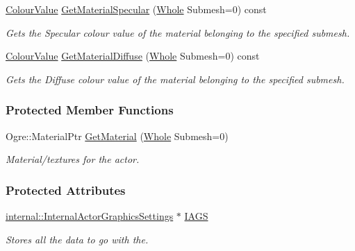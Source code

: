 \begin{DoxyCompactItemize}
\hyperlink{classphys_1_1ColourValue}{ColourValue} \hyperlink{classphys_1_1ActorGraphicsSettings_a2598d7db0dd899417aa3e4d017b8c6ab}{GetMaterialSpecular} (\hyperlink{namespacephys_a460f6bc24c8dd347b05e0366ae34f34a}{Whole} Submesh=0) const 
\begin{DoxyCompactList}\small\item\em Gets the Specular colour value of the material belonging to the specified submesh. \item\end{DoxyCompactList}\item 
\hyperlink{classphys_1_1ColourValue}{ColourValue} \hyperlink{classphys_1_1ActorGraphicsSettings_ab4b2a4938c6fb0c400882fb929bc7133}{GetMaterialDiffuse} (\hyperlink{namespacephys_a460f6bc24c8dd347b05e0366ae34f34a}{Whole} Submesh=0) const 
\begin{DoxyCompactList}\small\item\em Gets the Diffuse colour value of the material belonging to the specified submesh. \item\end{DoxyCompactList}\end{DoxyCompactItemize}
\subsubsection*{Protected Member Functions}
\begin{DoxyCompactItemize}
\item 
\hypertarget{classphys_1_1ActorGraphicsSettings_ade1b760cc01187e9ffdeed8871533066}{
Ogre::MaterialPtr \hyperlink{classphys_1_1ActorGraphicsSettings_ade1b760cc01187e9ffdeed8871533066}{GetMaterial} (\hyperlink{namespacephys_a460f6bc24c8dd347b05e0366ae34f34a}{Whole} Submesh=0)}
\label{dd/dd6/classphys_1_1ActorGraphicsSettings_ade1b760cc01187e9ffdeed8871533066}

\begin{DoxyCompactList}\small\item\em Material/textures for the actor. \item\end{DoxyCompactList}\end{DoxyCompactItemize}
\subsubsection*{Protected Attributes}
\begin{DoxyCompactItemize}
\item 
\hypertarget{classphys_1_1ActorGraphicsSettings_afc038a8da65483f028f799fb80f62848}{
\hyperlink{classphys_1_1internal_1_1InternalActorGraphicsSettings}{internal::InternalActorGraphicsSettings} $\ast$ \hyperlink{classphys_1_1ActorGraphicsSettings_afc038a8da65483f028f799fb80f62848}{IAGS}}
\label{dd/dd6/classphys_1_1ActorGraphicsSettings_afc038a8da65483f028f799fb80f62848}

\begin{DoxyCompactList}\small\item\em Stores all the data to go with the. \item\end{DoxyCompactList}\end{DoxyCompactItemize}



